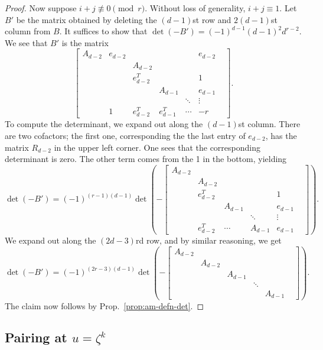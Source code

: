 \documentclass[reqno]{amsart}
\theoremstyle{definition}
\theoremstyle{remark}
\begin{document}
\begin{proof}
Now suppose $i+j \not\equiv 0 \pmod{r}$. Without loss of generality, $i + j \equiv 1$. Let $B'$ be the matrix obtained by deleting the $(d-1)$st row and $2(d-1)$st column from $B$. It suffices to show that $\det (-B') = (-1)^{d-1}(d-1)^2d^{r-2}$. We see that $B'$ is the matrix
\[
\left[\begin{array}{ccccccc}
  A_{d-2} & e_{d-2} & & & & e_{d-2} \\
  & & A_{d-2} & & & & \\
  & & e_{d-2}^T & & & 1 \\
  & & & A_{d-1} & & e_{d-1} \\
  & & & & \ddots & \vdots \\
  & 1 & e_{d-2}^T & e_{d-1}^T & \cdots & -r
\end{array}\right].
\]
To compute the determinant, we expand out along the $(d-1)$st column. There are two cofactors; the first one, corresponding the the last entry of $e_{d-2}$, has the matrix $R_{d-2}$ in the upper left corner. One sees that the corresponding determinant is zero. The other term comes from the 1 in the bottom, yielding
\[
\det (-B') = (-1)^{(r-1)(d-1)}\det \left(-\left[
  \begin{array}{cccccc}
  A_{d-2} & & & & & \\
  & A_{d-2} & & & & \\
  & e_{d-2}^T & & & 1 \\
  & & A_{d-1} & & e_{d-1} \\
  & & & \ddots & \vdots \\
  & e_{d-2}^T & \cdots & A_{d-1} & e_{d-1}
  \end{array}\right]\right).
\]
We expand out along the $(2d-3)$rd row, and by similar reasoning, we get
\[
\det (-B') = (-1)^{(2r-3)(d-1)}\det \left(-\left[
  \begin{array}{cccccc}
  A_{d-2} & & & & & \\
  & A_{d-2} & & & & \\
  & & A_{d-1} & & \\
  & & & \ddots &  \\
  & & & & A_{d-1}
  \end{array}\right]\right).
\]
The claim now follows by Prop.~\ref{prop:am-defn-det}.
\end{proof}

\subsection{Pairing at $u = \zeta^k$}
\label{sec:pairing-at-u-1}
\end{document}
